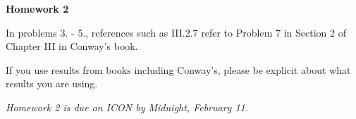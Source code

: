 \documentclass{article}%
\begin{document}
\begin{center}

\textbf{Homework 2}\bigskip

\end{center}





\noindent In problems 3. - 5., references such as III.2.7 refer to Problem 7 in Section 2 of Chapter III in Conway's book.\smallskip



\noindent If you use results from books including Conway's, please be explicit about what results you are using.






\begin{center}

\emph{Homework 2 is due on ICON by Midnight, February  11.}

\end{center} 

\medskip
\end{document}
